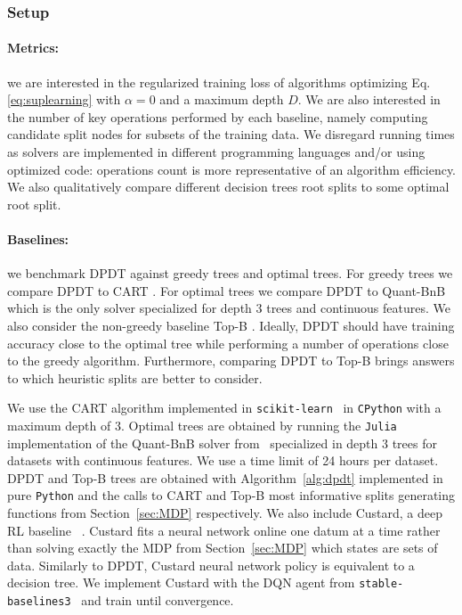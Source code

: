 \subsubsection{Setup}
\paragraph{Metrics:} we are interested in the regularized training loss of algorithms optimizing Eq.\ref{eq:suplearning} with $\alpha=0$ and a maximum depth $D$. We are also interested in the number of key operations performed by each baseline, namely computing candidate split nodes for subsets of the training data. We disregard running times as solvers are implemented in different programming languages and/or using optimized code: operations count is more representative of an algorithm efficiency. We also qualitatively compare different decision trees root splits to some optimal root split.
\paragraph{Baselines:} we benchmark DPDT against greedy trees and optimal trees. For greedy trees we compare DPDT to CART \cite{breiman1984classification}. For optimal trees we compare DPDT to Quant-BnB \cite{quantbnb} which is the only solver specialized for depth 3 trees and continuous features. We also consider the non-greedy baseline Top-B \cite{topk}. Ideally, DPDT should have training accuracy close to the optimal tree while performing a number of operations close to the greedy algorithm. Furthermore, comparing DPDT to Top-B brings answers to which heuristic splits are better to consider. 

We use the CART algorithm implemented in \texttt{scikit-learn}~\cite{scikit-learn} in \texttt{CPython} with a maximum depth of 3. Optimal trees are obtained by running the \texttt{Julia} implementation of the Quant-BnB solver from~\cite{quantbnb} specialized in depth 3 trees for datasets with continuous features. We use a time limit of 24 hours per dataset. 
DPDT and Top-B trees are obtained with Algorithm~\ref{alg:dpdt} implemented in pure \texttt{Python} and the calls to CART and Top-B most informative splits generating functions from Section~\ref{sec:MDP} respectively.
We also include Custard, a deep  RL baseline ~\cite{topin2021iterative}. Custard fits a neural network online one datum at a time rather than solving exactly the MDP from Section~\ref{sec:MDP} which states are sets of data. Similarly to DPDT, Custard neural network policy is equivalent to a decision tree. We implement Custard with the DQN agent from \texttt{stable-baselines3}~\cite{stable-baselines3} and train until convergence. 

